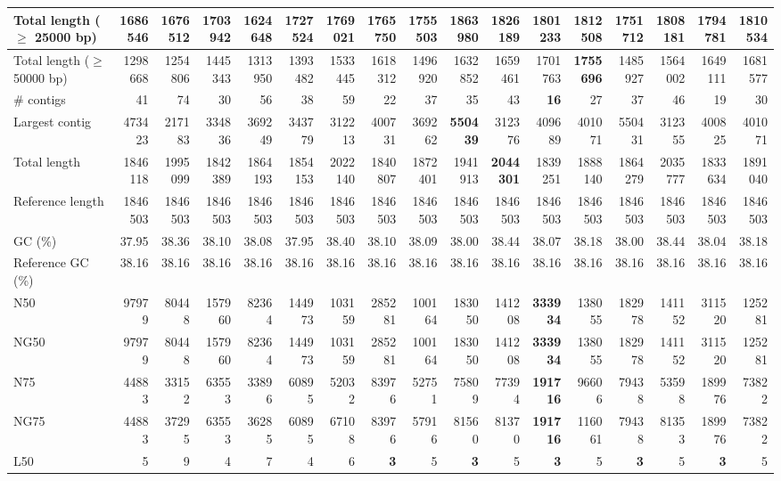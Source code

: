 \documentclass[12pt,a4paper]{article}
\begin{document}
\begin{table}[ht]
\begin{center}
\begin{tabular}{|l*{16}{|r}|}
Total length ($\geq$ 25000 bp) & 1686546 & 1676512 & 1703942 & 1624648 & 1727524 & 1769021 & 1765750 & 1755503 & {\bf 1863980} & 1826189 & 1801233 & 1812508 & 1751712 & 1808181 & 1794781 & 1810534 \\ \hline
Total length ($\geq$ 50000 bp) & 1298668 & 1254806 & 1445343 & 1313950 & 1393482 & 1533445 & 1618312 & 1496920 & 1632852 & 1659461 & 1701763 & {\bf 1755696} & 1485927 & 1564002 & 1649111 & 1681577 \\ \hline
\# contigs & 41 & 74 & 30 & 56 & 38 & 59 & 22 & 37 & 35 & 43 & {\bf 16} & 27 & 37 & 46 & 19 & 30 \\ \hline
Largest contig & 473423 & 217183 & 334836 & 369249 & 343779 & 312213 & 400731 & 369262 & {\bf 550439} & 312376 & 409689 & 401071 & 550431 & 312355 & 400825 & 401071 \\ \hline
Total length & 1846118 & 1995099 & 1842389 & 1864193 & 1854153 & 2022140 & 1840807 & 1872401 & 1941913 & {\bf 2044301} & 1839251 & 1888140 & 1864279 & 2035777 & 1833634 & 1891040 \\ \hline
Reference length & 1846503 & 1846503 & 1846503 & 1846503 & 1846503 & 1846503 & 1846503 & 1846503 & 1846503 & 1846503 & 1846503 & 1846503 & 1846503 & 1846503 & 1846503 & 1846503 \\ \hline
GC (\%) & 37.95 & 38.36 & 38.10 & 38.08 & 37.95 & 38.40 & 38.10 & 38.09 & 38.00 & 38.44 & 38.07 & 38.18 & 38.00 & 38.44 & 38.04 & 38.18 \\ \hline
Reference GC (\%) & 38.16 & 38.16 & 38.16 & 38.16 & 38.16 & 38.16 & 38.16 & 38.16 & 38.16 & 38.16 & 38.16 & 38.16 & 38.16 & 38.16 & 38.16 & 38.16 \\ \hline
N50 & 97979 & 80448 & 157960 & 82364 & 144973 & 103159 & 285281 & 100164 & 183050 & 141208 & {\bf 333934} & 138055 & 182978 & 141152 & 311520 & 125281 \\ \hline
NG50 & 97979 & 80448 & 157960 & 82364 & 144973 & 103159 & 285281 & 100164 & 183050 & 141208 & {\bf 333934} & 138055 & 182978 & 141152 & 311520 & 125281 \\ \hline
N75 & 44883 & 33152 & 63553 & 33896 & 60895 & 52032 & 83976 & 52751 & 75809 & 77394 & {\bf 191716} & 96606 & 79438 & 53598 & 189976 & 73822 \\ \hline
NG75 & 44883 & 37295 & 63553 & 36285 & 60895 & 67108 & 83976 & 57916 & 81560 & 81370 & {\bf 191716} & 116061 & 79438 & 81353 & 189976 & 73822 \\ \hline
L50 & 5 & 9 & 4 & 7 & 4 & 6 & {\bf 3} & 5 & {\bf 3} & 5 & {\bf 3} & 5 & {\bf 3} & 5 & {\bf 3} & 5 \\ \hline

\end{tabular}
\end{center}
\end{table}
\end{document}
